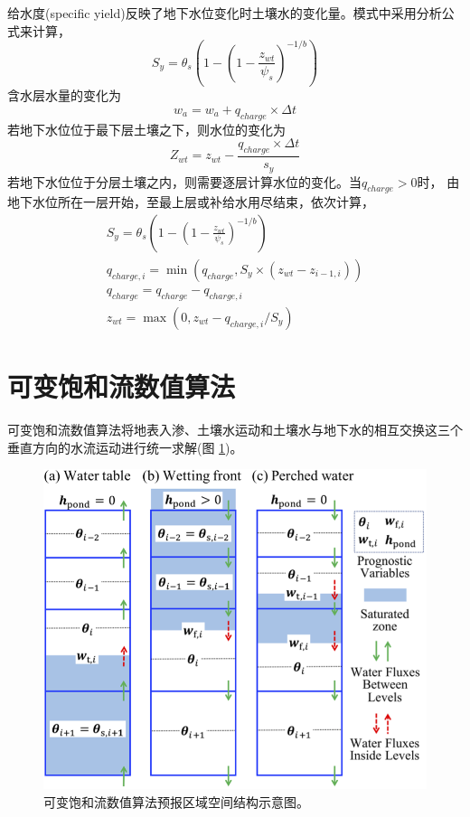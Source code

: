 给水度(specific yield)反映了地下水位变化时土壤水的变化量。模式中采用分析公式来计算，
\begin{equation}
{S}_{{y}}=\theta_{s}\left(1-\left(1-\frac{z_{w t}}{\psi_{s}}\right)^{-1 / b}\right)
\end{equation}
含水层水量的变化为
\begin{equation}
w_{a}=w_{a}+q_{charge} \times \Delta t
\end{equation}
若地下水位位于最下层土壤之下，则水位的变化为
\begin{equation}
Z_{w t}=z_{w t}-\frac{q_{charge} \times \Delta t}{s_{y}}
\end{equation}
若地下水位位于分层土壤之内，则需要逐层计算水位的变化。当$q_{charge}>0$时，
由地下水位所在一层开始，至最上层或补给水用尽结束，依次计算，
\begin{equation}
\begin{array}{c}{S}_{{y}}=\theta_{s}\left(1-\left(1-\frac{z_{w t}}{\psi_{s}}\right)^{-1 / b}\right) \\
     q_{ {charge }, i}=\min \left(q_{ {charge }}, S_{y} \times \left(z_{w t}-z_{i-1, i}\right)\right) \\
      q_{ {charge }}=q_{ {charge }}-q_{ {charge }, i} \\ 
      z_{w t}=\max \left(0, z_{w t}-q_{ {charge }, i} / S_{y}\right)\end{array}
\end{equation}

\section{可变饱和流数值算法}
可变饱和流数值算法将地表入渗、土壤水运动和土壤水与地下水的相互交换这三个垂直方向的水流运动进行统一求解(图 \ref{fig:可变饱和流数值算法预报区域空间结构示意图})。
{
\begin{figure}[htbp]
\centering
\includegraphics{Figures/陆地表面的水分循环/可变饱和流数值算法预报区域空间结构示意图.png}
\caption{可变饱和流数值算法预报区域空间结构示意图。}
\label{fig:可变饱和流数值算法预报区域空间结构示意图}
\end{figure}
}


